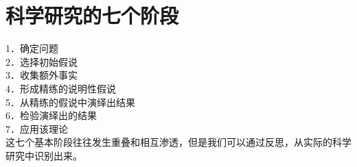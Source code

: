 \section*{科学研究的七个阶段}
1．确定问题\\
2．选择初始假说\\
3．收集额外事实\\
4．形成精练的说明性假说\\
5．从精练的假说中演绎出结果\\
6．检验演绎出的结果\\
7．应用该理论\\
这七个基本阶段往往发生重叠和相互渗透，但是我们可以通过反思，从实际的科学研究中识别出来。 